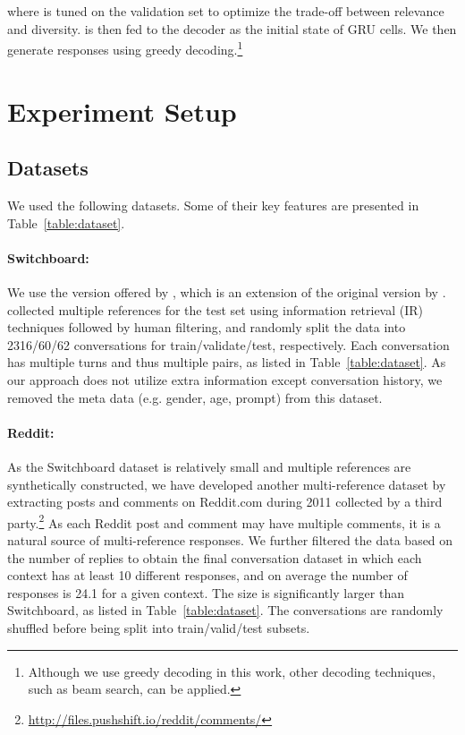 \documentclass[11pt,a4paper]{article}
\begin{document}
\label{sec:infer}
 where  is tuned on the validation set to optimize the trade-off between relevance and diversity.  is then fed to the decoder as the initial state of GRU cells. We then generate responses using greedy decoding.\footnote{Although we use greedy decoding in this work, other decoding techniques, such as beam search, can be applied.}
 
\section{Experiment Setup}
\subsection{Datasets}
We used the following datasets. Some of their key features are presented in Table~\ref{table:dataset}.


\paragraph{Switchboard:} We use the version offered by \citet{zhao2017cvae}, which is an extension of the original version by \citet{godfrey1997switchboard}. \citet{zhao2017cvae} collected multiple references for the test set using information retrieval (IR) techniques followed by human filtering, and randomly
split the data into 2316/60/62 conversations for
train/validate/test, respectively. Each conversation has multiple turns and thus multiple  pairs, as listed in Table~\ref{table:dataset}. As our approach does not utilize extra information except conversation history, we removed the meta data (e.g. gender, age, prompt) from this dataset.

\paragraph{Reddit:} As the Switchboard dataset is relatively small and multiple references are synthetically constructed, we have developed another multi-reference dataset by extracting posts and comments on Reddit.com during 2011 collected by a third party.\footnote{\url{http://files.pushshift.io/reddit/comments/}} As each Reddit post and comment may have multiple comments, it is a natural source of multi-reference responses. We further filtered the data based on the number of replies to obtain the final conversation dataset in which each context has at least 10 different responses, and on average the number of responses is 24.1 for a given context. The size is significantly larger than Switchboard, as listed in Table~\ref{table:dataset}. The conversations are randomly shuffled before being split into train/valid/test subsets.
\end{document}
